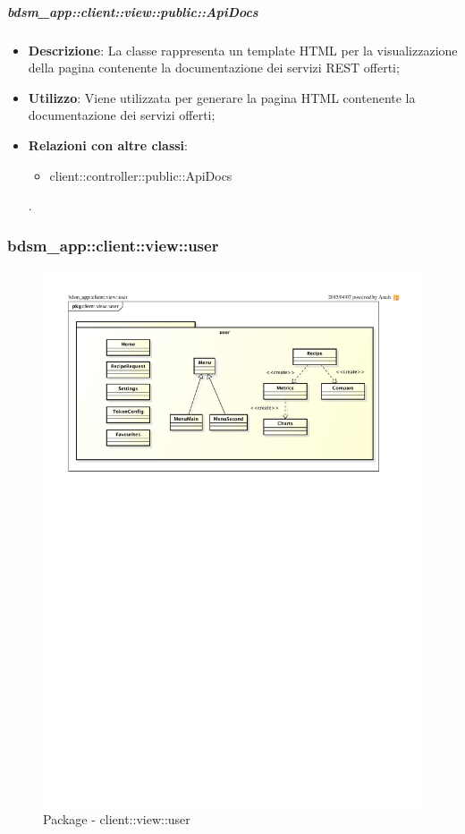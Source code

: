		\subparagraph{bdsm\_app::client::view::public::ApiDocs} %
		\label{subp:bdsm_app_client_view_public_apidocs}
			\begin{itemize}
				\item \textbf{Descrizione}: La classe rappresenta un template HTML per la visualizzazione della pagina contenente la documentazione dei servizi REST offerti;
				\item \textbf{Utilizzo}: Viene utilizzata per generare la pagina HTML contenente la documentazione dei servizi offerti;
				\item \textbf{Relazioni con altre classi}: 		
					\begin{itemize}
						\item client::controller::public::ApiDocs
					\end{itemize}.
			\end{itemize}



\subsubsection{bdsm\_app::client::view::user} %
\label{ssub:bdsm_app_client_view_user}
\begin{figure}[htbp]
	\centering
	\centerline{\includegraphics[scale=1.05]{./images/client_view_user.pdf}}
	\caption{Package - client::view::user}
\end{figure}

